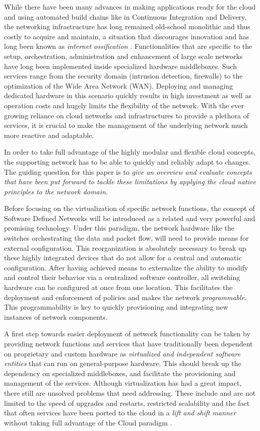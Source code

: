 While there have been many advances in making applications ready for the cloud  and using automated build chains like in Continuous Integration and Delivery, the networking infrastructure has long remained old-school monolithic and thus costly to acquire and maintain, a situation that discourages innovation and has long been known as \textit{internet ossification} \cite{nunes2014survey}. Functionalities that are specific to the setup, orchestration, administration and enhancement of large scale networks have long been implemented inside specialized hardware middleboxes. Such services range from the security domain (intrusion detection, firewalls) to the optimization of the Wide Area Network (WAN). Deploying and managing dedicated hardware in this scenario quickly results in high investment as well as operation costs and hugely limits the flexibility of the network. With the ever growing reliance on cloud networks and infrastructures to provide a plethora of services, it is crucial to make the management of the underlying network much more reactive and adaptable. 

In order to take full advantage of the highly modular and flexible cloud concepts, the supporting network has to be able to quickly and reliably adapt to changes. The guiding question for this paper is to \textit{give an overview and evaluate concepts that have been put forward to tackle these limitations by applying the cloud native principles to the network domain.}

Before focusing on the virtualization of specific network functions, the concept of Software Defined Networks will be introduced as a related and very powerful and promising technology. Under this paradigm, the network hardware like the switches orchestrating the data and packet flow, will need to provide means for external configuration. This reorganization is absolutely necessary to break up these highly integrated devices that do not allow for a central and automatic configuration. After having achieved means to externalize the ability to modify and control their behavior via a centralized software controller, all switching hardware can be configured at once from one location. This facilitates the deployment and enforcement of policies and makes the network \textit{programmable}. This programmability is key to quickly provisioning and integrating new instances of network components. 

A first step towards easier deployment of network functionality can be taken by providing network functions  and services that have traditionally been dependent on proprietary and custom hardware as \textit{virtualized and independent software entities} that can run on general-purpose hardware. This should break up the dependency on specialized middleboxes, and facilitate the provisioning and management of the services. Although virtualization has had a great impact, there still are unsolved problems that need addressing. These include and are not limited to the speed of upgrades and restarts, restricted scalability and the fact that often services have been ported to the cloud in a \textit{lift and shift manner} without taking full advantage of the Cloud paradigm \cite{CNF}.

